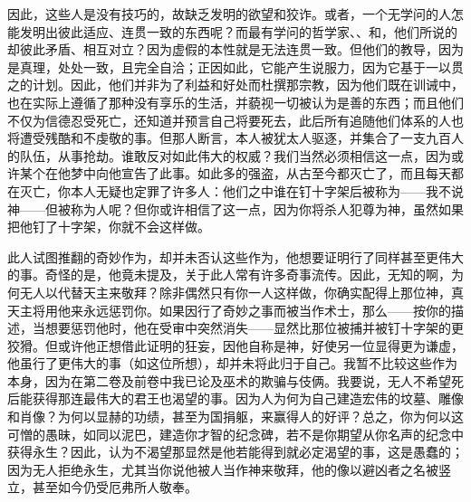 因此，这些人是没有技巧的，故缺乏发明的欲望和狡诈。或者，一个无学问的人怎能发明出彼此适应、连贯一致的东西呢？而最有学问的哲学家、、和，他们所说的却彼此矛盾、相互对立？因为虚假的本性就是无法连贯一致。但他们的教导，因为是真理，处处一致，且完全自洽；正因如此，它能产生说服力，因为它基于一以贯之的计划。因此，他们并非为了利益和好处而杜撰那宗教，因为他们既在训诫中，也在实际上遵循了那种没有享乐的生活，并藐视一切被认为是善的东西；而且他们不仅为信德忍受死亡，还知道并预言自己将要死去，此后所有追随他们体系的人也将遭受残酷和不虔敬的事。但那人断言，本人被犹太人驱逐，并集合了一支九百人的队伍，从事抢劫。谁敢反对如此伟大的权威？我们当然必须相信这一点，因为或许某个在他梦中向他宣告了此事。如此多的强盗，从古至今都灭亡了，而且每天都在灭亡，你本人无疑也定罪了许多人：他们之中谁在钉十字架后被称为——我不说神——但被称为人呢？但你或许相信了这一点，因为你将杀人犯尊为神，虽然如果把他钉了十字架，你就不会这样做。\par

此人试图推翻的奇妙作为，却并未否认这些作为，他想要证明行了同样甚至更伟大的事。奇怪的是，他竟未提及，关于此人常有许多奇事流传。因此，无知的啊，为何无人以代替天主来敬拜？除非偶然只有你一人这样做，你确实配得上那位神，真天主将用他来永远惩罚你。如果因行了奇妙之事而被当作术士，那么——按你的描述，当想要惩罚他时，他在受审中突然消失——显然比那位被捕并被钉十字架的更狡猾。但或许他正想借此证明的狂妄，因他自称是神，好使另一位显得更为谦虚，他虽行了更伟大的事（如这位所想），却并未将此归于自己。我暂不比较这些作为本身，因为在第二卷及前卷中我已论及巫术的欺骗与伎俩。我要说，无人不希望死后能获得那连最伟大的君王也渴望的事。因为人为何为自己建造宏伟的坟墓、雕像和肖像？为何以显赫的功绩，甚至为国捐躯，来赢得人的好评？总之，你为何以这可憎的愚昧，如同以泥巴，建造你才智的纪念碑，若不是你期望从你名声的纪念中获得永生？因此，认为不渴望那显然是他若能得到就必定渴望的事，这是愚蠢的；因为无人拒绝永生，尤其当你说他被人当作神来敬拜，他的像以避凶者之名被竖立，甚至如今仍受厄弗所人敬奉。\par

